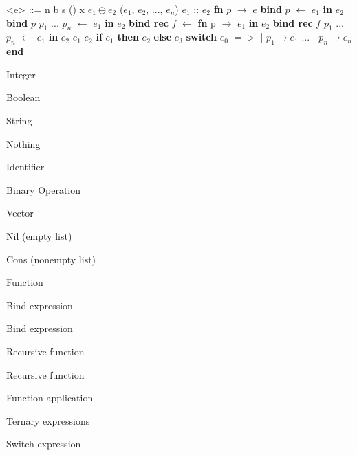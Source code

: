 \documentclass[titlepage]{article}
\begin{document}
\begin{minipage}[t]{0.6\textwidth}

  \begin{grammar}


    <e> ::= n 
    \alt b 
    \alt s 
    \alt () 
    \alt x
    \alt $e_1 \oplus e_2$
    \alt ($e_1$, $e_2$, ..., $e_n$)
    \alt [\space]
    \alt $e_1$ :: $e_2$
    \alt \textbf{fn} $p$ $\rightarrow$ $e$
    \alt \textbf{bind} $p$ $\leftarrow$ $e_1$ \textbf{in} $e_2$
    \alt \textbf{bind} $p$ \space $p_1$ ... $p_n$ $\leftarrow$ $e_1$ \textbf{in} $e_2$
    \alt \textbf{bind rec} $f$ $\leftarrow$ \textbf{fn} p $\rightarrow$ $e_1$ \textbf{in} $e_2$
    \alt \textbf{bind rec} $f$ \space $p_1$ ... $p_n$ $\leftarrow$ $e_1$ \textbf{in} $e_2$
    \alt $e_1$ \space $e_2$
    \alt \textbf{if} $e_1$ \textbf{then} $e_2$ \textbf{else} $e_3$
    \alt \textbf{switch} $e_0$ $=>$ | $p_1 \rightarrow e_1$ ... | $p_n \rightarrow e_n$ \textbf{end}
    
    
    \end{grammar}
\end{minipage}
\hfill
\begin{minipage}[t]{0.3\textwidth}

  Integer

  Boolean

  String

  Nothing

  Identifier

  Binary Operation

  Vector

  Nil (empty list)

  Cons (nonempty list)

  Function

  Bind expression

  Bind expression

  Recursive function

  Recursive function

  Function application

  Ternary expressions

  Switch expression
\end{minipage}
\end{document}
